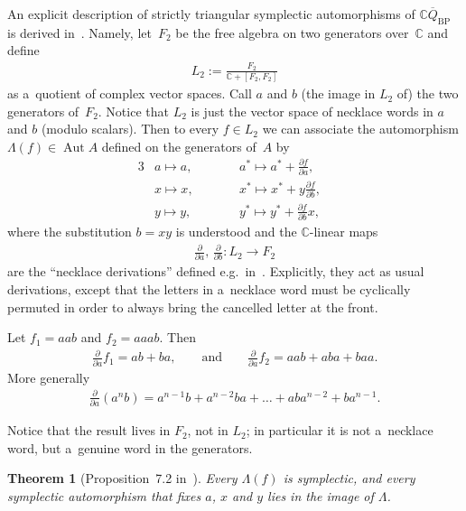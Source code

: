 \documentclass[11pt]{article}
\newtheorem{theorem}{Theorem}
\newcommand{\bb}[1]{\mathbb{#1}}
\newcommand{\app}[3]{#1\colon #2\to #3}
\newcommand{\ol}[1]{\overline{#1}}
\DeclareMathOperator{\Aut}{Aut}
\begin{document}
An explicit description of strictly triangular symplectic automorphisms of \(\bb{C}\ol{Q}_{\mathrm{BP}}\)
is derived in~\cite{bp08}.
Namely, let~\(F_{2}\) be the free algebra on two generators over~\(\bb{C}\) and def\/ine
\begin{gather}
\label{eq:def-L2}
L_{2}\mathrel{:=}\frac{F_{2}}{\bb{C}+[F_{2},F_{2}]}
\end{gather}
as  a~quotient of complex vector spaces.
Call \(a\) and \(b\) (the image in \(L_{2}\) of) the two generators of~\(F_{2}\).
Notice that \(L_{2}\) is just the vector space of necklace words in \(a\) and \(b\) (modulo scalars).
Then to every \(f\in L_{2}\) we can associate the automorphism \(\Lambda(f)\in \Aut A\) def\/ined on the
generators of~\(A\) by
\begin{alignat*}{3}
& a\mapsto a, \qquad && a^{*}\mapsto a^{*}+\frac{\partial f}{\partial a}, &\\
& x\mapsto x, \qquad && x^{*}\mapsto x^{*}+y\frac{\partial f}{\partial b}, & \\
& y\mapsto y, \qquad && y^{*}\mapsto y^{*}+\frac{\partial f}{\partial b}x, &
\end{alignat*}
where the substitution \(b=xy\) is understood and the \(\bb{C}\)-linear maps
\begin{gather*}%
\app{\frac{\partial}{\partial a},\,\frac{\partial}{\partial b}}{L_{2}}{F_{2}}
\end{gather*}
are the ``necklace derivations'' def\/ined e.g.\ in~\cite{blb02, ginz01}.
Explicitly, they act as usual derivations, except that the letters in a~necklace word must be cyclically
permuted in order to always bring the cancelled letter at the front.

\begin{example}
Let $f_1=aab$ and $f_2=aaab$.
Then
\begin{gather*}
\frac{\partial}{\partial a}f_1=ab+ba,\qquad \text{and}\qquad \frac{\partial}{\partial a}f_2=aab+aba+baa.
\end{gather*}
More generally
\begin{gather*}
\frac{\partial}{\partial a}(a^{n}b)=a^{n-1}b+a^{n-2}ba+\dots+aba^{n-2}+ba^{n-1}.
\end{gather*}
\end{example}

Notice that the result lives in \(F_{2}\), not in \(L_{2}\); in particular it is not a~necklace word, but
a~genuine word in the generators.
\begin{theorem}[Proposition~7.2 in~\cite{bp08}]
\label{teo:bp}
Every \(\Lambda(f)\) is symplectic, and every symplectic automorphism that fixes \(a\), \(x\) and \(y\)
lies in the image of \(\Lambda\).
\end{theorem}
\end{document}
